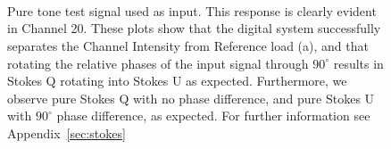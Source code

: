 \begin{figure}[ht]
 \centering
{}\\
\\
\\
 \caption{Pure tone test signal used as input. This response is clearly evident in Channel 20. These plots show that the digital system successfully separates the Channel Intensity from Reference load (a), and that rotating the relative phases of the input signal through $90^{\circ}$ results in Stokes Q rotating into Stokes U as expected. Furthermore, we observe pure Stokes Q with no phase difference, and pure Stokes U with $90^{\circ}$ phase difference, as expected. For further information see Appendix~\ref{sec:stokes}}
 \label{fig:rotating}
\end{figure}

